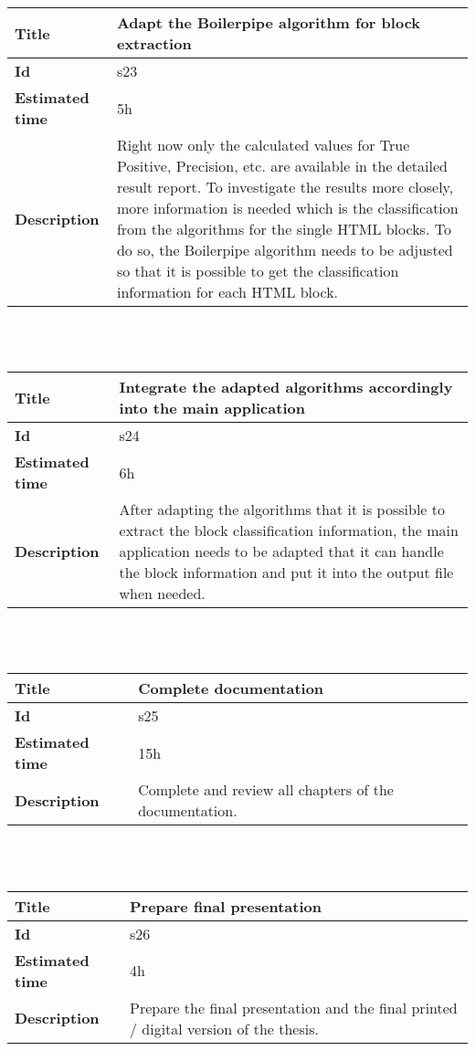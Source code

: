     \begin{tabular}{ | p{4cm} | p{10cm} |}
    \hline
    \textbf{Title} & Adapt the Boilerpipe algorithm for block extraction\\ \hline
    \textbf{Id} & s23\\ \hline
    \textbf{Estimated time} & 5h \\ \hline
    \textbf{Description} &  Right now only the calculated values for True Positive, Precision, etc. are available in the detailed result report. To investigate the results more closely, more information is needed which is the classification from the algorithms for the single HTML blocks. To do so, the Boilerpipe algorithm needs to be adjusted so that it is possible to get the classification information for each HTML block.\\ 
    \hline
    \end{tabular} \\\\


     \begin{tabular}{ | p{4cm} | p{10cm} |}
    \hline
    \textbf{Title} & Integrate the adapted algorithms accordingly into the main application\\ \hline
    \textbf{Id} & s24\\ \hline
    \textbf{Estimated time} & 6h \\ \hline
    \textbf{Description} &  After adapting the algorithms that it is possible to extract the block classification information, the main application needs to be adapted that it can handle the block information and put it into the output file when needed.\\ 
    \hline
    \end{tabular} \\\\


    \begin{tabular}{ | p{4cm} | p{10cm} |}
    \hline
    \textbf{Title} & Complete documentation\\ \hline
    \textbf{Id} & s25\\ \hline
    \textbf{Estimated time} & 15h \\ \hline
    \textbf{Description} &  Complete and review all chapters of the documentation.  \\ 
    \hline
    \end{tabular} \\\\

    \begin{tabular}{ | p{4cm} | p{10cm} |}
    \hline
    \textbf{Title} & Prepare final presentation\\ \hline
    \textbf{Id} & s26\\ \hline
    \textbf{Estimated time} & 4h \\ \hline
    \textbf{Description} &  Prepare the final presentation and the final printed / digital version of the thesis.  \\ 
    \hline
    \end{tabular} \\\\






